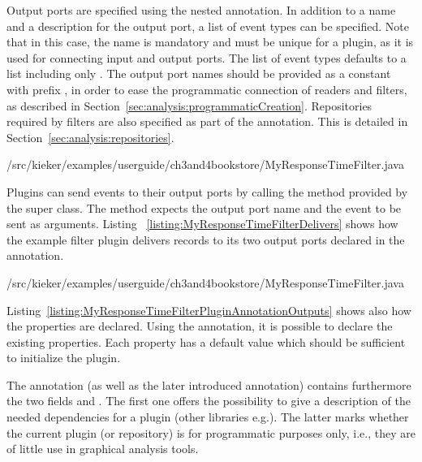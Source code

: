 Output ports are specified using the nested  annotation. %
In addition to a name and a description for the output port, a list of event %
types can be specified. Note that in this case, the name is mandatory and must %
be unique for a plugin, as it is used for connecting input and output ports. %
The list of event types defaults to a list including only . %
The output port names should be provided as a  constant %
with prefix , in order to ease the programmatic %
connection of readers and filters, as described in %
Section~\ref{sec:analysis:programmaticCreation}. Repositories required by %
filters are also specified as part of the  annotation. %
This is detailed in Section~\ref{sec:analysis:repositories}. %

\setJavaCodeListing
%
{\customComponentsBookstoreApplicationDir/src/kieker/examples/userguide/ch3and4bookstore/MyResponseTimeFilter.java}

\noindent Plugins can send events to their output ports by calling the %
 method provided by the super class. The method expects the %
output port name and the event to be sent as arguments. Listing~%
\ref{listing:MyResponseTimeFilterDelivers} %
shows how the example filter plugin  delivers records %
to its two output ports declared in the  annotation.


\setJavaCodeListing
%
{\customComponentsBookstoreApplicationDir/src/kieker/examples/userguide/ch3and4bookstore/MyResponseTimeFilter.java}

Listing~\ref{listing:MyResponseTimeFilterPluginAnnotationOutputs} shows also how %
the properties are declared. Using the  annotation, it is possible to declare %
the existing properties. Each property has a default value which should be sufficient %
to initialize the plugin.%

The  annotation (as well as the later introduced  annotation) contains %
furthermore the two fields  and . The first %
one offers the possibility to give a description of the needed dependencies for a plugin %
(other libraries e.g.). The latter marks whether the current plugin (or repository) is for %
programmatic purposes only, i.e., they are of little use in graphical analysis %
tools.

